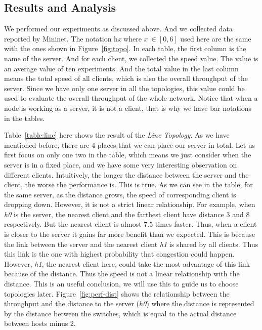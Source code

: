 \subsection{Results and Analysis} \label{subsec:result}
We performed our experiments as discussed above. And we collected data reported by Mininet.
The notation h{\it x} where {\it x} $\in [0, 6]$ used here are the same with the ones 
shown in Figure~\ref{fig:topo}. In each table, the first column is the name of the server.
And for each client, we collected the speed value. The value is an average value of ten
experiments. And the total value in the last column means the total speed of all clients, 
which is also the overall throughput of the server. Since we have only one server in all the 
topologies, this value could be used to evaluate the overall throughput of the whole network. 
Notice that when a node is working as a server, it is not a client, that is why we have bar 
notations in the tables.

Table~\ref{table:line} here shows the result of the {\it Line Topology}. As we have 
mentioned before, there are 4 places that we can place our server in total. Let us first 
focus on only one two in the table, which means we just consider when the server is in a fixed
place, and we have some very interesting observation on different clients. Intuitively, 
the longer the distance between the server and the client, the worse the performance is. 
This is true. As we can see in the table, for the same server, as the distance grows, 
the speed of corresponding client is dropping down. However, it is not a strict linear 
relationship. For example, when {\it h0} is the server, the nearest client 
and the farthest client have distance $3$ and $8$ respectively. But the nearest client is 
almost $7.5$ times faster. Thus, when a client is closer to the server it gains far more benefit
than we expected. This is because the link between the server and the nearest client
{\it h1} is shared by all clients. Thus this link is the one with highest probability that 
congestion could happen. However, {\it h1}, the nearest client here, could take the most advantage of
this link because of the distance. Thus the speed is not a linear relationship with the distance.
This is an useful conclusion, we will use this to guide us to choose topologies later.
Figure~\ref{fig:perf-dist} shows the relationship between the throughput and the distance to
the server ({\it h0}) where the distance is represented by the distance between the switches, 
which is equal to the actual distance between hosts minus 2.

